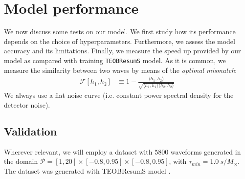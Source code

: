 \section{Model performance}
\label{sec:performance}
We now discuss some tests on our model. We first study how its performance depends on the choice of hyperparameters. Furthermore, we assess the model accuracy and its limitations.
Finally, we measure the speed up provided by our model as compared with training \texttt{TEOBResumS} model.
As it is common, we measure the similarity between two waves by means of the \textit{optimal mismatch}:
\begin{align}
	\bar{\mathcal{F}}[h_1,h_2] &\equiv 1- \frac{\langle h_1, h_2 \rangle}{\sqrt{\langle h_1, h_1 \rangle \langle h_2, h_2 \rangle}}	\label{eq:mismatch_def}
\end{align}
We always use a flat noise curve (i.e. constant power spectral density for the detector noise).
\subsection{Validation}
Wherever relevant, we will employ a dataset with $5800$ waveforms generated in the domain $\mathcal{P} = [1,20]\times[-0.8,0.95]\times[-0.8,0.95]$, with $\tau_{min} = \SI{1.0}{s/M_\odot}$. The dataset was generated with TEOBResumS model \cite{}.
